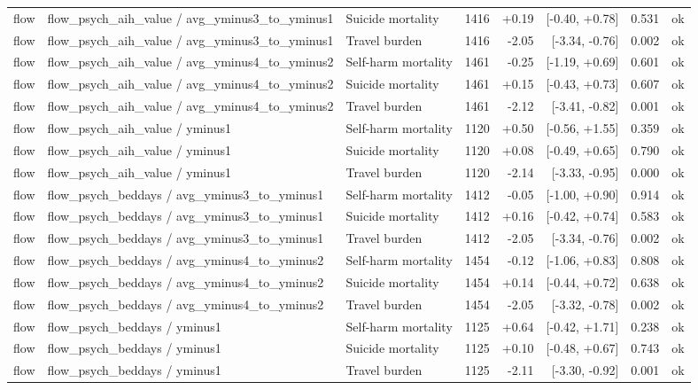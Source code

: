 \begin{table}[!htbp]
{\begin{tabular}{lllrrrrl}
flow & flow\_psych\_aih\_value / avg\_yminus3\_to\_yminus1 & Suicide mortality & 1416 & +0.19 & [-0.40, +0.78] & 0.531 & ok \\
flow & flow\_psych\_aih\_value / avg\_yminus3\_to\_yminus1 & Travel burden & 1416 & -2.05 & [-3.34, -0.76] & 0.002 & ok \\
flow & flow\_psych\_aih\_value / avg\_yminus4\_to\_yminus2 & Self-harm mortality & 1461 & -0.25 & [-1.19, +0.69] & 0.601 & ok \\
flow & flow\_psych\_aih\_value / avg\_yminus4\_to\_yminus2 & Suicide mortality & 1461 & +0.15 & [-0.43, +0.73] & 0.607 & ok \\
flow & flow\_psych\_aih\_value / avg\_yminus4\_to\_yminus2 & Travel burden & 1461 & -2.12 & [-3.41, -0.82] & 0.001 & ok \\
flow & flow\_psych\_aih\_value / yminus1 & Self-harm mortality & 1120 & +0.50 & [-0.56, +1.55] & 0.359 & ok \\
flow & flow\_psych\_aih\_value / yminus1 & Suicide mortality & 1120 & +0.08 & [-0.49, +0.65] & 0.790 & ok \\
flow & flow\_psych\_aih\_value / yminus1 & Travel burden & 1120 & -2.14 & [-3.33, -0.95] & 0.000 & ok \\
flow & flow\_psych\_beddays / avg\_yminus3\_to\_yminus1 & Self-harm mortality & 1412 & -0.05 & [-1.00, +0.90] & 0.914 & ok \\
flow & flow\_psych\_beddays / avg\_yminus3\_to\_yminus1 & Suicide mortality & 1412 & +0.16 & [-0.42, +0.74] & 0.583 & ok \\
flow & flow\_psych\_beddays / avg\_yminus3\_to\_yminus1 & Travel burden & 1412 & -2.05 & [-3.34, -0.76] & 0.002 & ok \\
flow & flow\_psych\_beddays / avg\_yminus4\_to\_yminus2 & Self-harm mortality & 1454 & -0.12 & [-1.06, +0.83] & 0.808 & ok \\
flow & flow\_psych\_beddays / avg\_yminus4\_to\_yminus2 & Suicide mortality & 1454 & +0.14 & [-0.44, +0.72] & 0.638 & ok \\
flow & flow\_psych\_beddays / avg\_yminus4\_to\_yminus2 & Travel burden & 1454 & -2.05 & [-3.32, -0.78] & 0.002 & ok \\
flow & flow\_psych\_beddays / yminus1 & Self-harm mortality & 1125 & +0.64 & [-0.42, +1.71] & 0.238 & ok \\
flow & flow\_psych\_beddays / yminus1 & Suicide mortality & 1125 & +0.10 & [-0.48, +0.67] & 0.743 & ok \\
flow & flow\_psych\_beddays / yminus1 & Travel burden & 1125 & -2.11 & [-3.30, -0.92] & 0.001 & ok \\

\end{tabular}}
\end{table}
